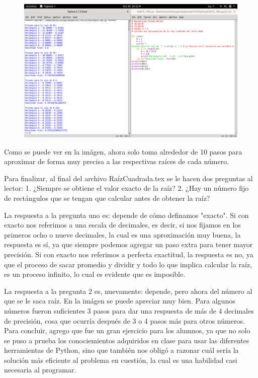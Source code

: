 \documentclass[]{article}
\begin{document}
\begin{figure}[H]
	\centering
	\includegraphics[width=1.02\linewidth]{"Imagenes/Captura 7"}
	\caption{}
	\label{fig:captura-7}
\end{figure}
Como se puede ver en la imágen, ahora solo toma alrededor de 10 pasos para aproximar de forma muy precisa a las respectivas raíces de cada número.

Para finalizar, al final del archivo RaízCuadrada.tex se le hacen dos preguntas al lector: 1. ¿Siempre se obtiene el valor exacto de la raíz?
2. ¿Hay un número fijo de rectángulos que se tengan que calcular antes
de obtener la raíz?

La respuesta a la pregunta uno es: depende de cómo definamos "exacto". Si con exacto nos referimos a una escala de decimales, es decir, si nos fijamos en los primeros ocho o nueve decimales, la cual es una aproximación muy buena, la respuesta es sí, ya que siempre podemos agregar un paso extra para tener mayor precisión. Si con exacto nos referimos a perfecta exactitud, la respuesta es no, ya que el proceso de sacar promedio y dividir y todo lo que implica calcular la raíz, es un proceso infinito, lo cual es evidente que es imposible.

La respuesta a la pregunta 2 es, nuevamente: depende, pero ahora del número al que se le saca raíz. En la imágen se puede apreciar muy bien. Para algunos números fueron suficientes 3 pasos para dar una respuesta de más de 4 decimales de precisión, cosa que ocurría después de 3 o 4 pasos más para otros números.
Para concluir, agrego que fue un gran ejercicio para los alumnos, ya que no solo se puso a prueba los conociemientos adquiridos en clase para usar las diferentes herramientas de Python, sino que también nos obligó a razonar cuál sería la solución más eficiente al problema en cuestión, la cual es una habilidad casi necesaria al programar.
\section{}
\end{document}

